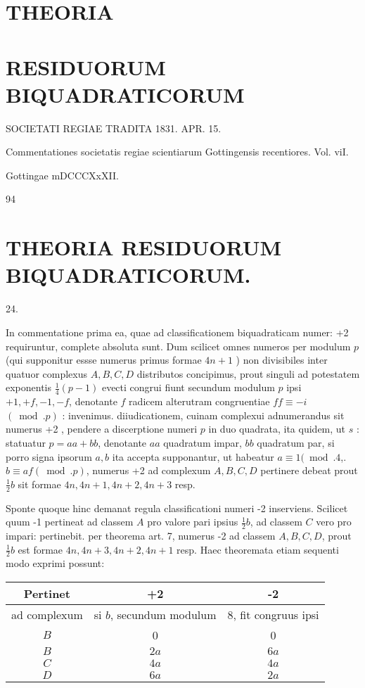 \documentclass[10pt]{article}
\begin{document}
\section*{THEORIA }
\section*{RESIDUORUM BIQUADRATICORUM}
SOCIETATI REGIAE TRADITA 1831. APR. 15.

Commentationes societatis regiae scientiarum Gottingensis recentiores. Vol. viI.

Gottingae mDCCCXxXII.

94

\section*{THEORIA RESIDUORUM BIQUADRATICORUM. }


24.

In commentatione prima ea, quae ad classificationem biquadraticam numer: +2 requiruntur, complete absoluta sunt. Dum scilicet omnes numeros per modulum \(p\) (qui supponitur essse numerus primus formae \(4 n+1\) ) non divisibiles inter quatuor complexus \(A, B, C, D\) distributos concipimus, prout singuli ad potestatem exponentis \(\frac{1}{4}(p-1)\) evecti congrui fiunt secundum modulum \(p\) ipsi \(+1,+f,-1,-f\), denotante \(f\) radicem alterutram congruentiae \(f f \equiv-i\) \((\bmod . p)\) : invenimus. diiudicationem, cuinam complexui adnumerandus sit numerus +2 , pendere a discerptione numeri \(p\) in duo quadrata, ita quidem, ut \(s\) : statuatur \(p=a a+b b\), denotante \(a a\) quadratum impar, \(b b\) quadratum par, si porro signa ipsorum \(a, b\) ita accepta supponantur, ut habeatur \(a \equiv 1(\bmod .4\),. \(b \equiv a f(\bmod . p)\), numerus +2 ad complexum \(A, B, C, D\) pertinere debeat prout \(\frac{1}{2} b\) sit formae \(4 n, 4 n+1,4 n+2,4 n+3\) resp.

Sponte quoque hinc demanat regula classificationi numeri -2 inserviens. Scilicet quum -1 pertineat ad classem \(A\) pro valore pari ipsius \(\frac{1}{2} b\), ad classem \(C\) vero pro impari: pertinebit. per theorema art. 7, numerus -2 ad classem \(A, B, C, D\), prout \(\frac{1}{2} b\) est formae \(4 n, 4 n+3,4 n+2,4 n+1\) resp. Haec theoremata etiam sequenti modo exprimi possunt:

\begin{center}
\begin{tabular}{c|c|c}
Pertinet & +2 & -2 \\
\hline
ad complexum & si \(b\), secundum modulum & 8, fit congruus ipsi \\
\cline { 2 - 3 }
\(B\) & 0 & 0 \\
\(B\) & \(2 a\) & \(6 a\) \\
\(C\) & \(4 a\) & \(4 a\) \\
\(D\) & \(6 a\) & \(2 a\) \\
\end{tabular}
\end{center}
\end{document}
